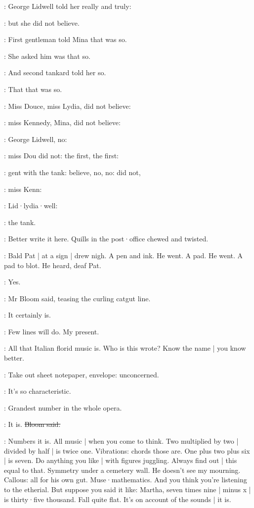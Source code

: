 :
George Lidwell told her really and truly:

:
but she did not believe.

:
First gentleman told Mina that was so.

:
She asked him was that so.

:
And second tankard told her so.

:
That that was so.

:
Miss Douce,
miss Lydia,
did not believe:

:
miss Kennedy,
Mina,
did not believe:

:
George Lidwell,
no:

:
miss Dou did not:
the first,
the first:

:
gent with the tank:
believe,
no, no:
did not,

:
miss Kenn:

:
Lid·lydia·well:

:
the tank.

\BloomIntA:
Better write it here.
Quills in the post·office chewed and twisted.

:
Bald Pat |
at a sign |
drew nigh.
A pen and ink.
He went.
A pad.
He went.
A pad to blot.
He heard,
deaf Pat.

\Bloom:
Yes.

:
Mr Bloom said,
teasing the curling catgut line.

\Bloom:
It certainly is.

\BloomIntA:
Few lines will do.
My present.

\Bloom:
All that Italian florid music is.
Who is this wrote?
Know the name |
you know better.

\BloomIntA:
Take out
sheet notepaper,
envelope:
unconcerned.

\Bloom:
It's so characteristic.

\goulding:
Grandest number in the whole opera.

\Bloom:
It is.
\sout{Bloom said.}

\BloomIntA:
Numbers it is.
All music |
when you come to think.
Two multiplied by two |
divided by half |
is twice one.
Vibrations:
chords those are.
One plus two plus six |
is seven.
Do anything you like |
with figures juggling.
Always find out |
this equal to that.
Symmetry under a cemetery wall.
He doesn't see my mourning.
Callous:
all for his own gut.
Muse·mathematics.
And you think you're listening to the etherial.
But suppose you said it like:
Martha,
seven times nine |
minus x |
is thirty·five thousand.
Fall quite flat.
It's on account of the sounds |
it is.

